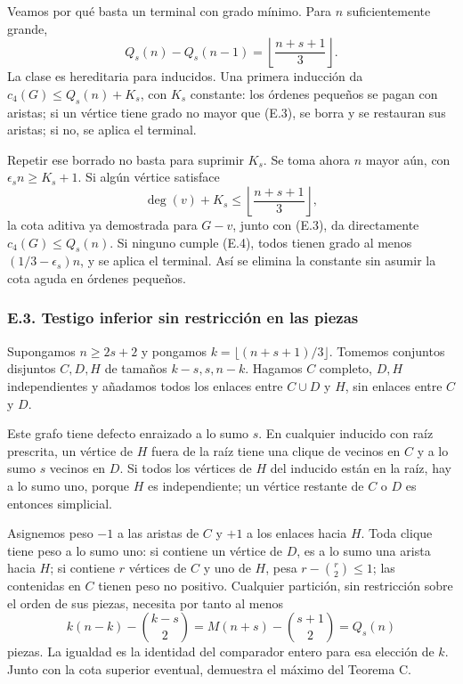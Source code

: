\documentclass[spanish,11pt,a4paper]{article}
\begin{document}
Veamos por qué basta un terminal con grado mínimo. Para \(n\) suficientemente grande, \[
Q_s(n)-Q_s(n-1)=\left\lfloor\frac{n+s+1}{3}\right\rfloor.
\tag{E.3}
\] La clase es hereditaria para inducidos. Una primera inducción da \(c_4(G)\le Q_s(n)+K_s\), con \(K_s\) constante: los órdenes pequeños se pagan con aristas; si un vértice tiene grado no mayor que (E.3), se borra y se restauran sus aristas; si no, se aplica el terminal.

Repetir ese borrado no basta para suprimir \(K_s\). Se toma ahora \(n\) mayor aún, con \(\epsilon_s n\ge K_s+1\). Si algún vértice satisface \[
\deg(v)+K_s\le\left\lfloor\frac{n+s+1}{3}\right\rfloor,
\tag{E.4}
\] la cota aditiva ya demostrada para \(G-v\), junto con (E.3), da directamente \(c_4(G)\le Q_s(n)\). Si ninguno cumple (E.4), todos tienen grado al menos \((1/3-\epsilon_s)n\), y se aplica el terminal. Así se elimina la constante sin asumir la cota aguda en órdenes pequeños.

\subsubsection{E.3. Testigo inferior sin restricción en las piezas}\label{e.3.-testigo-inferior-sin-restriccion-en-las-piezas}

Supongamos \(n\ge2s+2\) y pongamos \(k=\lfloor(n+s+1)/3\rfloor\). Tomemos conjuntos disjuntos \(C,D,H\) de tamaños \(k-s,s,n-k\). Hagamos \(C\) completo, \(D,H\) independientes y añadamos todos los enlaces entre \(C\cup D\) y \(H\), sin enlaces entre \(C\) y \(D\).

Este grafo tiene defecto enraizado a lo sumo \(s\). En cualquier inducido con raíz prescrita, un vértice de \(H\) fuera de la raíz tiene una clique de vecinos en \(C\) y a lo sumo \(s\) vecinos en \(D\). Si todos los vértices de \(H\) del inducido están en la raíz, hay a lo sumo uno, porque \(H\) es independiente; un vértice restante de \(C\) o \(D\) es entonces simplicial.

Asignemos peso \(-1\) a las aristas de \(C\) y \(+1\) a los enlaces hacia \(H\). Toda clique tiene peso a lo sumo uno: si contiene un vértice de \(D\), es a lo sumo una arista hacia \(H\); si contiene \(r\) vértices de \(C\) y uno de \(H\), pesa \(r-\binom r2\le1\); las contenidas en \(C\) tienen peso no positivo. Cualquier partición, sin restricción sobre el orden de sus piezas, necesita por tanto al menos \[
k(n-k)-\binom{k-s}{2}
=M(n+s)-\binom{s+1}{2}=Q_s(n)
\tag{E.5}
\] piezas. La igualdad es la identidad del comparador entero para esa elección de \(k\). Junto con la cota superior eventual, demuestra el máximo del Teorema C.
\end{document}
